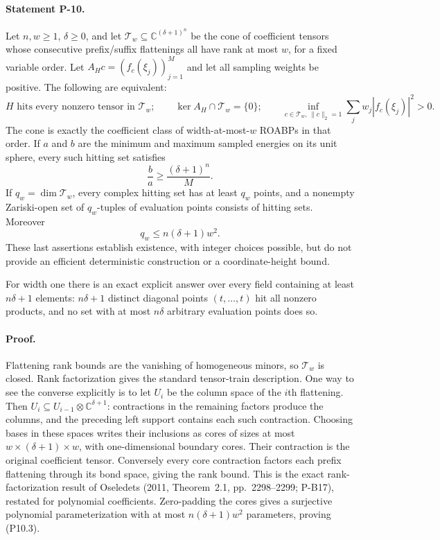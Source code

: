 \documentclass[11pt,a4paper]{article}
\theoremstyle{definition}\newtheorem{definition}{Definition}
\begin{document}
\paragraph{Statement P-10.}
Let $n,w\ge1$, $\delta\ge0$, and let $\mathcal T_w\subseteq\mathbb C^{(\delta+1)^n}$ be the cone of coefficient tensors whose consecutive prefix/suffix flattenings all have rank at most $w$, for a fixed variable order. Let $A_Hc=(f_c(\xi_j))_{j=1}^M$ and let all sampling weights be positive. The following are equivalent:
\[
 H\text{ hits every nonzero tensor in }\mathcal T_w;
 \qquad \ker A_H\cap\mathcal T_w=\{0\};
 \qquad \inf_{c\in\mathcal T_w,\,\|c\|_2=1}
       \sum_jw_j|f_c(\xi_j)|^2>0.
 \tag{P10.1}
\]
The cone is exactly the coefficient class of width-at-most-$w$ ROABPs in that order. If $a$ and $b$ are the minimum and maximum sampled energies on its unit sphere, every such hitting set satisfies
\[
 \frac ba\ge\frac{(\delta+1)^n}{M}.
 \tag{P10.2}
\]
If $q_w=\dim\mathcal T_w$, every complex hitting set has at least $q_w$ points, and a nonempty Zariski-open set of $q_w$-tuples of evaluation points consists of hitting sets. Moreover
\[
 q_w\le n(\delta+1)w^2.
 \tag{P10.3}
\]
These last assertions establish existence, with integer choices possible, but do not provide an efficient deterministic construction or a coordinate-height bound.

For width one there is an exact explicit answer over every field containing at least $n\delta+1$ elements: $n\delta+1$ distinct diagonal points $(t,\ldots,t)$ hit all nonzero products, and no set with at most $n\delta$ arbitrary evaluation points does so.
\paragraph{Proof.}
Flattening rank bounds are the vanishing of homogeneous minors, so $\mathcal T_w$ is closed. Rank factorization gives the standard tensor-train description. One way to see the converse explicitly is to let $U_i$ be the column space of the $i$th flattening. Then
$U_i\subseteq U_{i-1}\otimes\mathbb C^{\delta+1}$: contractions in the remaining factors produce the columns, and the preceding left support contains each such contraction. Choosing bases in these spaces writes their inclusions as cores of sizes at most $w\times(\delta+1)\times w$, with one-dimensional boundary cores. Their contraction is the original coefficient tensor. Conversely every core contraction factors each prefix flattening through its bond space, giving the rank bound. This is the exact rank-factorization result of Oseledets (2011, Theorem~2.1, pp.~2298--2299; P-B17), restated for polynomial coefficients. Zero-padding the cores gives a surjective polynomial parameterization with at most $n(\delta+1)w^2$ parameters, proving (P10.3).
\end{document}
